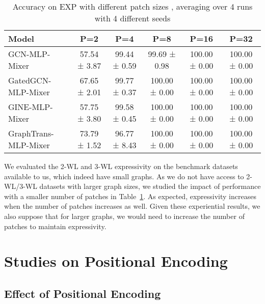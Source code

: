 \documentclass{article}
\begin{document}
\begin{table}[!ht]
\caption{Accuracy on EXP with different patch sizes , averaging over 4 runs with 4 different seeds}
  \label{tab: exp}
    \centering
    \small
    \begin{tabular}{lccccc}
    \toprule
    Model & P=2 &P=4 & P=8 & P=16 & P=32 \\
\midrule
     {GCN-MLP-Mixer}
     & 57.54 ± 3.87 
     & 99.44 ± 0.59 &99.69 ± 0.98 & 100.00 ± 0.00 & 100.00 ± 0.00  \\
     {GatedGCN-MLP-Mixer}
     & 67.65 ± 2.01 
     & 99.77 ± 0.37 & 100.00 ± 0.00 & 100.00 ± 0.00 & 100.00 ± 0.00  \\
     {GINE-MLP-Mixer}
     & 57.75 ± 3.80 
     & 99.58 ± 0.45 
     & 100.00 ± 0.00 & 100.00 ± 0.00 & 100.00 ± 0.00  \\
     {GraphTrans-MLP-Mixer}& 73.79 ± 1.52 & 96.77 ± 8.43 & 100.00 ± 0.00& 100.00 ± 0.00 & 100.00 ± 0.00  \\
     \bottomrule
    \end{tabular}
    \end{table}
    
We evaluated the 2-WL and 3-WL expressivity on the benchmark datasets available to us, which indeed have small graphs. As we do not have access to 2-WL/3-WL datasets with larger graph sizes, we studied the impact of performance with a smaller number of patches in Table~\ref{tab: exp}. As expected, expressivity increases when the number of patches increases as well. Given these experiential results, we also suppose that for larger graphs, we would need to increase the number of patches to maintain expressivity.


\section{Studies on Positional Encoding}\label{app sec: pe}



\subsection{Effect of Positional Encoding}
\end{document}
